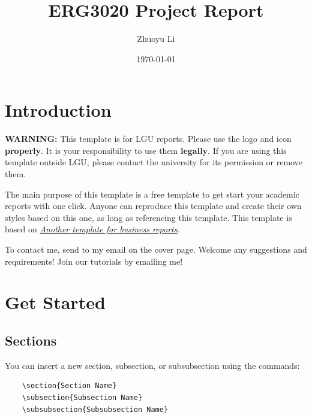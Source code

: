 \documentclass[12pt]{article}
\title{ERG3020 Project Report}
\author{Zhuoyu Li \newline 118010159}
\date{\today}
\begin{document}
\maketitle

\tableofcontents
\clearpage

\section{Introduction}

\textbf{WARNING:} This template is for LGU reports. Please use the logo and icon \textbf{properly}. It is your responsibility to use them \textbf{legally}. If you are using this template outside LGU, please contact the university for its permission or remove them.

The main purpose of this template is a free template to get start your academic reports with one click. Anyone can reproduce this template and create their own styles based on this one, as long as referencing this template. This template is based on \href{https://www.overleaf.com/latex/templates/another-template-for-business-reports/jjqkjjmcptkg}{\textit{Another template for business reports}}.

To contact me, send to my email on the cover page. Welcome any suggestions and requirements! Join our tutorials by emailing me!

\section{Get Started}

\subsection{Sections}

You can insert a new section, subsection, or subsubsection using the commands:

\begin{verbatim}
    \section{Section Name}
    \subsection{Subsection Name}
    \subsubsection{Subsubsection Name}
\end{verbatim}
\end{document}
